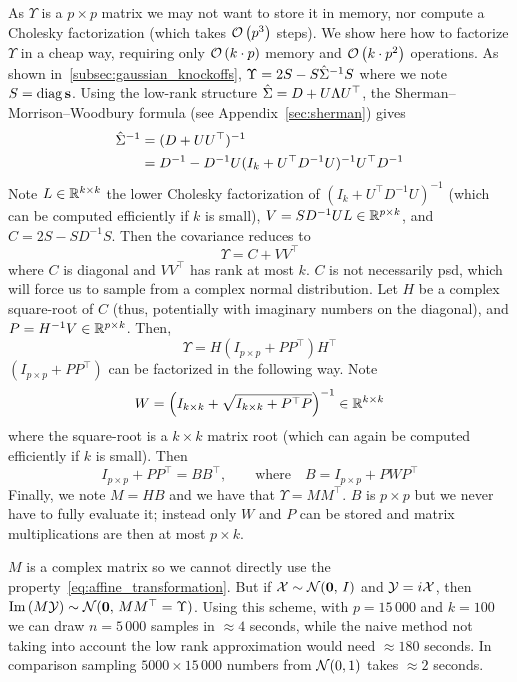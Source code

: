 As $\Upsilon$ is a $p \times p$ matrix we may not want to store it in memory,
nor compute a Cholesky factorization (which takes $\mathcal{O}\left( p^3 \right)$ steps).
We show here how to factorize $\Upsilon$ in a cheap way,
requiring only $\mathcal{O}\left( k \cdot p \right)$ memory and $\mathcal{O}\left( k\cdot p^2 \right)$ operations.
As shown in~\ref{subsec:gaussian_knockoffs}, $\Upsilon = 2S - S\hat{\Sigma}^{-1}S$ where we note $S = \operatorname*{diag}\mathbf{s}$.
Using the low-rank structure $\hat{\Sigma} = D + U\Lambda U^\top$,
the Sherman–Morrison–Woodbury formula (see Appendix~\ref{sec:sherman}) gives
\begin{align*}
    \hat{\Sigma}^{-1} &= (D + UU^\top)^{-1}\\
    &= D^{-1} - D^{-1}U(I_k + U^\top D^{-1}U)^{-1}U^\top D^{-1}
\end{align*}
Note $L \in \mathbb{R}^{k \times k}$ the lower Cholesky factorization of
$(I_k + U^\top D^{-1}U)^{-1}$ (which can be computed efficiently if $k$ is small),
$V = SD^{-1}UL \in \mathbb{R}^{p \times k}$,
and $C = 2S - SD^{-1}S$.
Then the covariance reduces to
\begin{equation*}
    \Upsilon = C + VV^\top
\end{equation*}
where $C$ is diagonal and $VV^\top$ has rank at most $k$.
$C$ is not necessarily psd, which will force us to sample from a complex normal distribution.
Let $H$ be a complex square-root of $C$ (thus, potentially with imaginary numbers on the diagonal),
and $P = H^{-1}V \in \mathbb{R}^{p \times k}$.
Then,
\begin{equation*}
    \Upsilon = H \left( I_{p \times p} + PP^\top \right) H^\top
\end{equation*}
$\left( I_{p \times p} + PP^\top \right)$ can be factorized in the following way.
Note
\begin{equation*}
    W = \left(I_{k \times k} + \sqrt{I_{k \times k} + P^\top P}\right)^{-1} \in \mathbb{R}^{k \times k}
\end{equation*}
where the square-root is a $k \times k$ matrix root (which can again be computed efficiently if $k$ is small).
Then
\begin{equation*}
    I_{p \times p} + PP^\top = BB^\top
    ,\qquad
    \text{where}
    \quad
    B = I_{p \times p} + PWP^\top
\end{equation*}
Finally, we note $M = HB$ and we have that $\Upsilon = MM^\top$.
$B$ is $p \times p$ but we never have to fully evaluate it;
instead only $W$ and $P$ can be stored and matrix multiplications are then at most $p \times k$.

$M$ is a complex matrix so we cannot directly use the property~\ref{eq:affine_transformation}.
But if $\mathcal{X} \sim \mathcal{N}(\mathbf{0},\, I)$ and $\mathcal{Y} = i\mathcal{X}$,
then $\operatorname{Im}\left( M\mathcal{Y} \right) \sim \mathcal{N}(\mathbf{0},\, MM^\top = \Upsilon)$.
Using this scheme, with $p = 15\,000$ and $k = 100$ we can draw $n = 5\,000$ samples in $\approx 4$ seconds,
while the naive method not taking into account the low rank approximation would need $\approx 180$ seconds.
In comparison sampling $5000 \times 15\,000$ numbers from $\mathcal{N}(0, 1)$ takes $\approx 2$ seconds.
